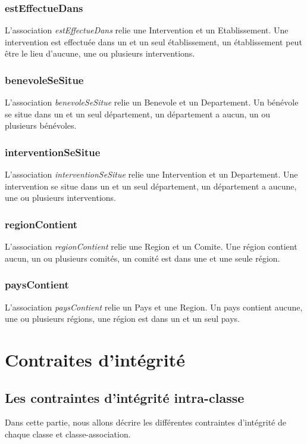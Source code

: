 \documentclass[asi, sansVersion]{picInsa}
\begin{document}
\subsection*{estEffectueDans}

L'association \textit{estEffectueDans} relie une Intervention et un Etablissement. Une intervention est effectuée dans un et un seul établissement, un établissement peut être le lieu d'aucune, une ou plusieurs interventions.

\subsection*{benevoleSeSitue}

L'association \textit{benevoleSeSitue} relie un Benevole et un Departement. Un bénévole se situe dans un et un seul département, un département a aucun, un ou plusieurs bénévoles.

\subsection*{interventionSeSitue}

L'association \textit{interventionSeSitue} relie une Intervention et un Departement. Une intervention se situe dans un et un seul département, un département a aucune, une ou plusieurs interventions.

\subsection*{regionContient}

L'association \textit{regionContient} relie une Region et un Comite. Une région contient aucun, un ou plusieurs comités, un comité est dans une et une seule région.

\subsection*{paysContient}

L'association \textit{paysContient} relie un Pays et une Region. Un pays contient aucune, une ou plusieurs régions, une région est dans un et un seul pays.

\chapter{Contraites d'intégrité}

\section{Les contraintes d'intégrité intra-classe}
Dans cette partie, nous allons décrire les différentes contraintes d'intégrité de chaque classe et classe-association.
 
\end{document}
